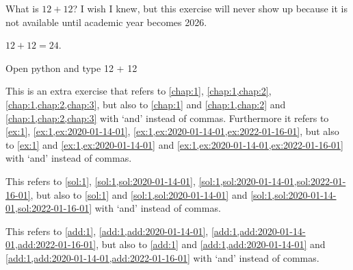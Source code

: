 \documentclass[oneside]{book}
\begin{document}


\begin{exercise}[examdate={January 16, 2026}, examproblemnumber={1}, examproblemid={2026-01-16-01}]
  What is \(12 + 12\)? I wish I knew, but this exercise will never show up because it is not available until academic year becomes 2026.
\end{exercise}

\begin{solution}
  \(12 + 12 = 24\).
\end{solution}

\begin{additionalinformation}
Open python and type 12 + 12
\end{additionalinformation}

\begin{exercise}
This is an extra exercise that refers to \cref{chap:1}, \cref{chap:1,chap:2}, \cref{chap:1,chap:2,chap:3},
but also to \cref{chap:1} and \cref{chap:1,chap:2} and \cref{chap:1,chap:2,chap:3} with `and' instead of commas.
Furthermore it refers to \cref{ex:1}, \cref{ex:1,ex:2020-01-14-01}, \cref{ex:1,ex:2020-01-14-01,ex:2022-01-16-01},
but also to \cref{ex:1} and \cref{ex:1,ex:2020-01-14-01} and \cref{ex:1,ex:2020-01-14-01,ex:2022-01-16-01} with `and' instead of commas.
\end{exercise}

\begin{solution}
This refers to \cref{sol:1}, \cref{sol:1,sol:2020-01-14-01}, \cref{sol:1,sol:2020-01-14-01,sol:2022-01-16-01},
but also to \cref{sol:1} and \cref{sol:1,sol:2020-01-14-01} and \cref{sol:1,sol:2020-01-14-01,sol:2022-01-16-01} with `and' instead of commas.
\end{solution}

\begin{additionalinformation}
This refers to \cref{add:1}, \cref{add:1,add:2020-01-14-01}, \cref{add:1,add:2020-01-14-01,add:2022-01-16-01},
but also to \cref{add:1} and \cref{add:1,add:2020-01-14-01} and \cref{add:1,add:2020-01-14-01,add:2022-01-16-01} with `and' instead of commas.
\end{additionalinformation}
\end{document}
